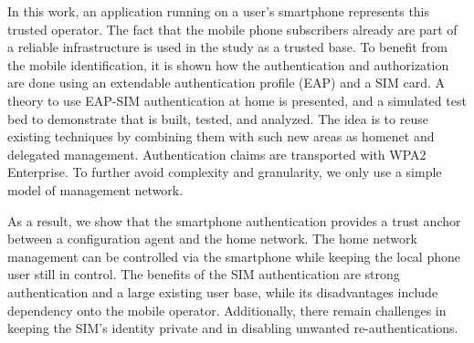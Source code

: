\documentclass[12pt,a4paper,english]{tutthesis}
\begin{document}
In this work, an application running on a user's smartphone represents this trusted operator. 
The fact that the mobile phone subscribers already are part of a reliable infrastructure
is used in the study as a trusted base.
To benefit from the mobile identification, it is shown how the authentication
and authorization are done using an extendable authentication profile (EAP) and a SIM card.
A theory to use EAP-SIM authentication at home is presented, and a simulated test bed
to demonstrate that is built, tested, and analyzed.
The idea is to reuse existing techniques by combining them with such new areas as homenet and delegated management.
Authentication claims are transported with WPA2 Enterprise.
To further avoid complexity and granularity, we
only use a simple model of management network. 

As a result, we show that the smartphone authentication provides a trust anchor
between a configuration agent and the home network. 
The home network management can be controlled via the smartphone while keeping
the local phone user still in control.
The benefits of the SIM authentication are strong 
authentication and a large existing  user base, while its disadvantages include
dependency onto the mobile operator. Additionally, there remain challenges
in keeping the SIM's identity private and in disabling unwanted 
re-authentications.
\end{document}
